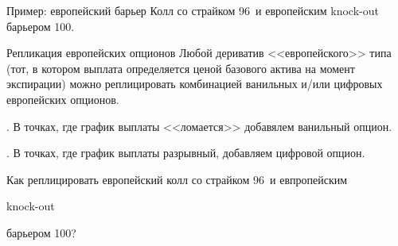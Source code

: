 \documentclass{beamer}
\newcommand{\en}[1]{\begin{otherlanguage}{english}#1\end{otherlanguage}}
\newcommand{\usdrubstrike}{96}
\newcommand{\usdrubbarrier}{100}
\begin{document}
\begin{frame}{Пример: европейский барьер}
\justify
Колл со страйком \usdrubstrike\ и европейским knock-out барьером \usdrubbarrier.

\centering
\end{frame}



\begin{frame}{Репликация европейских опционов}
\justify
Любой дериватив <<европейского>> типа (тот, в котором выплата определяется ценой 
базового актива на момент экспирации) можно реплицировать комбинацией ванильных и/или
цифровых европейских опционов.

. В точках, где график выплаты <<ломается>> добавялем ванильный опцион.

. В точках, где график выплаты разрывный, добавляем цифровой опцион.

\justify
Как реплицировать европейский колл со страйком \usdrubstrike\ и евпропейским \en{knock-out} 
барьером \usdrubbarrier?
\end{frame}
\end{document}
